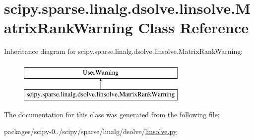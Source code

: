 \hypertarget{classscipy_1_1sparse_1_1linalg_1_1dsolve_1_1linsolve_1_1MatrixRankWarning}{}\section{scipy.\+sparse.\+linalg.\+dsolve.\+linsolve.\+Matrix\+Rank\+Warning Class Reference}
\label{classscipy_1_1sparse_1_1linalg_1_1dsolve_1_1linsolve_1_1MatrixRankWarning}
Inheritance diagram for scipy.\+sparse.\+linalg.\+dsolve.\+linsolve.\+Matrix\+Rank\+Warning\+:\begin{figure}[H]
\begin{center}
\leavevmode
\includegraphics[height=2.000000cm]{classscipy_1_1sparse_1_1linalg_1_1dsolve_1_1linsolve_1_1MatrixRankWarning}
\end{center}
\end{figure}


The documentation for this class was generated from the following file\+:\begin{DoxyCompactItemize}
\item 
packages/scipy-\/0../scipy/sparse/linalg/dsolve/\hyperlink{linsolve_8py}{linsolve.\+py}\end{DoxyCompactItemize}
